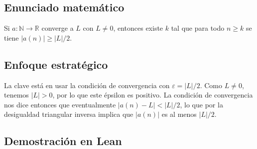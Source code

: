 \subsection{Enunciado matemático}

\begin{theorem}
Si $a : \mathbb{N} \to \mathbb{R}$ converge a $L$ con $L \neq 0$, entonces
existe $k$ tal que para todo $n \geq k$ se tiene $|a(n)| \geq |L|/2$.
\end{theorem}

\subsection{Enfoque estratégico}

La clave está en usar la condición de convergencia con $\varepsilon = |L|/2$.
Como $L \neq 0$, tenemos $|L| > 0$, por lo que este épsilon es positivo. La
condición de convergencia nos dice entonces que eventualmente
$|a(n) - L| < |L|/2$, lo que por la desigualdad triangular inversa implica
que $|a(n)|$ es al menos $|L|/2$.

\subsection{Demostración en Lean}

